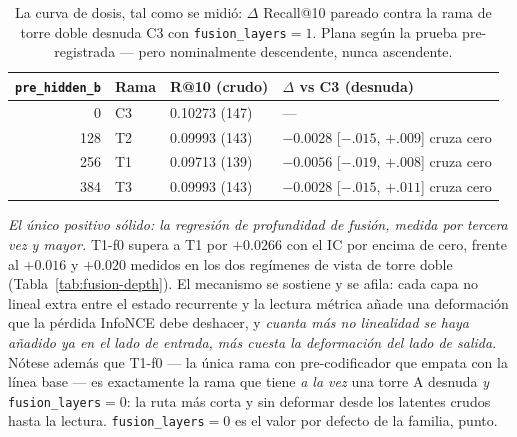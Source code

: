 \documentclass[11pt]{article}
\begin{document}
\begin{table}[ht]
  \centering
  \caption{La curva de dosis, tal como se midió: $\Delta$ Recall@10 pareado
  contra la rama de torre doble desnuda C3 con
  \texttt{fusion\_layers}${}=1$. Plana según la prueba pre-registrada --- pero
  nominalmente descendente, nunca ascendente.}
  \label{tab:preencoder-dose}
  {\footnotesize\setlength{\tabcolsep}{6pt}\begin{tabular}{rlll}
    \toprule
    \texttt{pre\_hidden\_b} & Rama & R@10 (crudo) & $\Delta$ vs C3 (desnuda) \\
    \midrule
    0 & C3 & 0.10273 (147) & --- \\
    128 & T2 & 0.09993 (143) & $-0.0028$ [$-.015$, $+.009$] cruza cero \\
    256 & T1 & 0.09713 (139) & $-0.0056$ [$-.019$, $+.008$] cruza cero \\
    384 & T3 & 0.09993 (143) & $-0.0028$ [$-.015$, $+.011$] cruza cero \\
    \bottomrule
  \end{tabular}}
\end{table}

\emph{El único positivo sólido: la regresión de profundidad de fusión, medida por
tercera vez y mayor.} T1-f0 supera a T1 por $+\num{0.0266}$ con el IC por encima
de cero, frente al $+\num{0.016}$ y $+\num{0.020}$ medidos en los dos regímenes de
vista de torre doble (Tabla~\ref{tab:fusion-depth}). El mecanismo se sostiene y
se afila: cada capa no lineal extra entre el estado recurrente y la lectura
métrica añade una deformación que la pérdida InfoNCE debe deshacer, y \emph{cuanta
más no linealidad se haya añadido ya en el lado de entrada, más cuesta la
deformación del lado de salida}. Nótese además que T1-f0 --- la única rama con
pre-codificador que empata con la línea base --- es exactamente la rama que tiene
\emph{a la vez} una torre A desnuda \emph{y} \texttt{fusion\_layers}${}=0$: la
ruta más corta y sin deformar desde los latentes crudos hasta la lectura.
\texttt{fusion\_layers}${}=0$ es el valor por defecto de la familia, punto.
\end{document}
